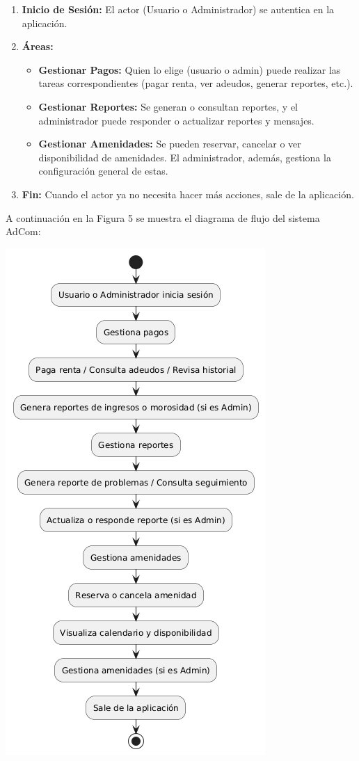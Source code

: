\documentclass[protocolo.tex]{subfiles}
\begin{document}
\begin{enumerate}
    \item \textbf{Inicio de Sesión:}  
    El actor (Usuario o Administrador) se autentica en la aplicación.
    \item \textbf{Áreas:} 
    \begin{itemize}
        \item \textbf{Gestionar Pagos:}  Quien lo elige (usuario o admin) puede realizar las tareas correspondientes (pagar renta, ver adeudos, generar reportes, etc.).
        \item \textbf{Gestionar Reportes:}  Se generan o consultan reportes, y el administrador puede responder o actualizar reportes y mensajes.
        \item \textbf{Gestionar Amenidades:}  Se pueden reservar, cancelar o ver disponibilidad de amenidades. El administrador, además, gestiona la configuración general de estas.
    \end{itemize} 
    
    \item \textbf{Fin:}  
    Cuando el actor ya no necesita hacer más acciones, sale de la aplicación.

\end{enumerate}
A continuación en la Figura 5 se muestra el diagrama de flujo del sistema AdCom:\vspace{4mm}
\begin{center}
\includegraphics[scale=0.5]{Imagenes/Pdf/AdcomF.png}
\end{center}
\end{document}
